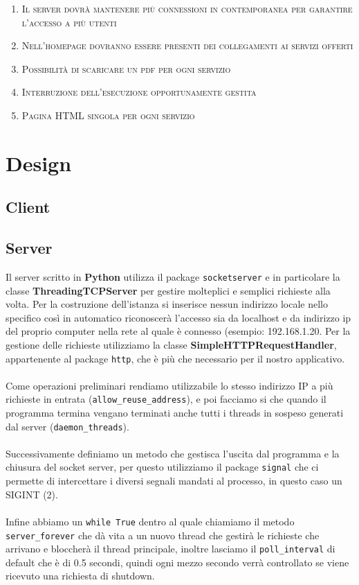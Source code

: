 \documentclass[a4paper,12pt]{report}
\begin{document}
\begin{enumerate}
    \item \textsc{Il server dovrà mantenere più connessioni in contemporanea per garantire l'accesso a più utenti}
    \item \textsc{Nell’homepage dovranno essere presenti dei collegamenti ai servizi offerti}
    \item \textsc{Possibilità di scaricare un pdf per ogni servizio}
    \item \textsc{Interruzione dell'esecuzione opportunamente gestita}
    \item \textsc{Pagina HTML singola per ogni servizio}
\end{enumerate}
 


\chapter{Design}

\section{Client}

\clearpage

\section{Server}
Il server scritto in \textbf{Python} utilizza il package \texttt{socketserver} e in particolare la classe \textbf{ThreadingTCPServer} per gestire molteplici e semplici richieste alla volta.
Per la costruzione dell’istanza si inserisce nessun indirizzo locale nello specifico così in automatico riconoscerà l’accesso sia da localhost e da indirizzo ip del proprio computer nella rete al quale è connesso (esempio: 192.168.1.20.
Per la gestione delle richieste utilizziamo la classe \textbf{SimpleHTTPRequestHandler}, appartenente al package \texttt{http}, che è più che necessario per il nostro applicativo.
\\
\\
Come operazioni preliminari rendiamo utilizzabile lo stesso indirizzo IP a più richieste in entrata (\texttt{allow\_reuse\_address}), e poi facciamo si che quando il programma termina vengano terminati anche tutti i threads in sospeso generati dal server (\texttt{daemon\_threads}).
\\
\\
Successivamente definiamo un metodo che gestisca l’uscita dal programma e la chiusura del socket server, per questo utilizziamo il package \texttt{signal} che ci permette di intercettare i diversi segnali mandati al processo, in questo caso un SIGINT (2).
\\
\\
Infine abbiamo un \texttt{while True} dentro al quale chiamiamo il metodo \texttt{server\_forever} che dà vita a un nuovo thread che gestirà le richieste che arrivano e bloccherà il thread principale, inoltre lasciamo il \texttt{poll\_interval} di default che è di 0.5 secondi, quindi ogni mezzo secondo verrà controllato se viene ricevuto una richiesta di shutdown.
\end{document}
